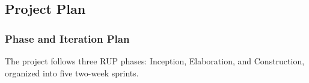 \subsection{Project Plan}



\subsubsection{Phase and Iteration Plan}

The project follows three RUP phases:
Inception, Elaboration, and Construction,
organized into five two-week sprints.

